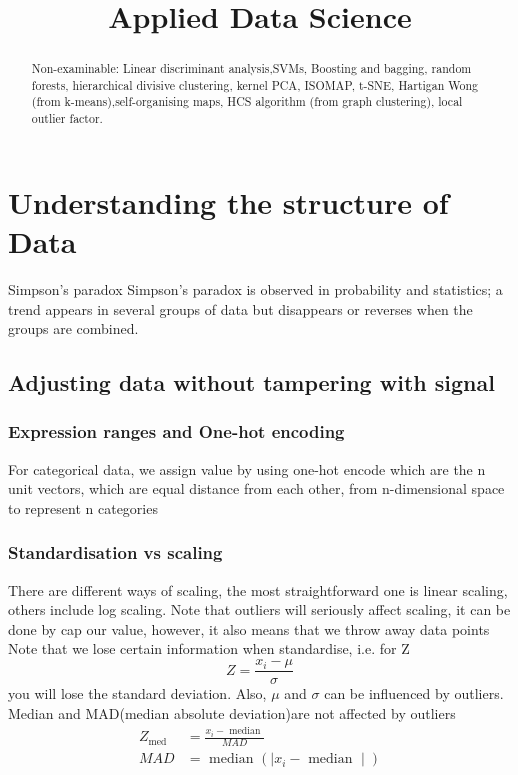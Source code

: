 \documentclass[12pt,a4paper]{article}
\newcommand{\topic}{Applied Data Science}
\begin{document}
\title{\topic}
\begin{titlepage}
    \maketitle
\end{titlepage}

\tableofcontents

\newpage
\begin{abstract}
\noindent
Non-examinable:
Linear discriminant analysis,SVMs, Boosting and bagging, random forests, hierarchical divisive clustering, kernel PCA, ISOMAP, t-SNE, Hartigan Wong (from k-means),self-organising maps, HCS algorithm (from graph clustering), local outlier factor.
\end{abstract}

\section{Understanding the structure of Data}

\begin{theorem}
    {Simpson's paradox}
    {Simpson's paradox is observed in probability and statistics; a trend appears in several groups of data but disappears or reverses when the groups are combined.}
\end{theorem}

\subsection{Adjusting data without tampering with signal}
\subsubsection{Expression ranges and One-hot encoding}
For categorical data, we assign value by using one-hot encode which are the n unit vectors, which are equal distance from each other, from n-dimensional space to represent n categories
\subsubsection{Standardisation vs scaling}
There are different ways of scaling, the most straightforward one is linear scaling, others include log scaling.
Note that outliers will seriously affect scaling, it can be done by cap our value, however, it also means that we throw away data points
Note that we lose certain information when standardise, i.e. for Z 
$$
Z=\frac{x_i-\mu}{\sigma}
$$
you will lose the standard deviation.
Also, $\mu$ and $\sigma$ can be influenced by outliers. Median and MAD(median absolute deviation)are not affected by outliers
\begin{align}
    Z_{\text {med }} & =\frac{x_i-\text { median }}{M A D} \\
    M A D & =\text { median }\left(\mid x_i-\text { median } \mid\right)
\end{align} 
\end{document}
